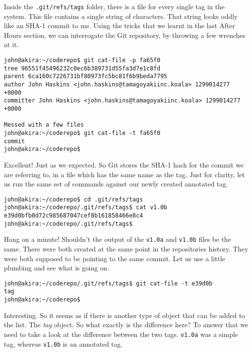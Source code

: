 Inside the \texttt{.git/refs/tags} folder, there is a file for every single tag in the system.  This file contains a single string of characters.  That string looks oddly like an SHA-1 commit to me.  Using the tricks that we learnt in the last After Hours section, we can interrogate the Git repository, by throwing a few wrenches at it.

\begin{Verbatim}[frame=leftline,framerule=1mm,fontsize=\relsize{-3}] 
john@akira:~/coderepo$ git cat-file -p fa65f0
tree 96551f45496232c0ec6b389731d55fa3d7e1c8fd
parent 6ca160c7226731bf80973fc5bc81f6b9beda7795
author John Haskins <john.haskins@tamagoyakiinc.koala> 1299014277 +0000
committer John Haskins <john.haskins@tamagoyakiinc.koala> 1299014277 +0000

Messed with a few files
john@akira:~/coderepo$ git cat-file -t fa65f0
commit
john@akira:~/coderepo$ 
\end{Verbatim}

Excellent!  Just as we expected.  So Git stores the SHA-1 hash for the commit we are referring to, in a file which has the same name as the tag.  Just for clarity, let us run the same set of commands against our newly created annotated tag.

\begin{Verbatim}[frame=leftline,framerule=1mm,fontsize=\relsize{-3}] 
john@akira:~/coderepo$ cd .git/refs/tags
john@akira:~/coderepo/.git/refs/tags$ cat v1.0b
e39d0bfb0d72c985687047cef8b161858466e8c4
john@akira:~/coderepo/.git/refs/tags$
\end{Verbatim}

Hang on a minute!  Shouldn't the output of the \texttt{v1.0a} and \texttt{v1.0b} files be the same.  There were both created at the same point in the repositories history.  They were both supposed to be pointing to the same commit.  Let us use a little plumbing and see what is going on.

\begin{Verbatim}[frame=leftline,framerule=1mm,fontsize=\relsize{-3}] 
john@akira:~/coderepo/.git/refs/tags$ git cat-file -t e39d0b
tag
john@akira:~/coderepo$ 
\end{Verbatim}

Interesting.  So it seems as if there is another type of object that can be added to the list.  The \emph{tag} object.  So what exactly is the difference here?  To answer that we need to take a look at the difference between the two tags.  \texttt{v1.0a} was a simple tag, whereas \texttt{v1.0b} is an annotated tag.  

